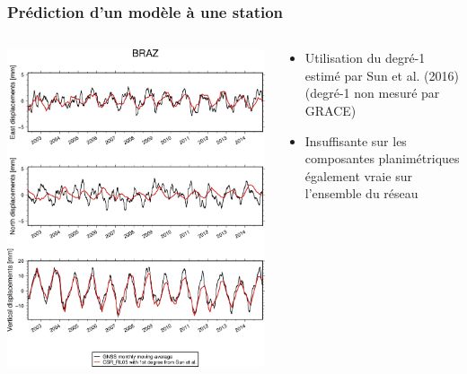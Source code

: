 \documentclass[9pt]{beamer}
\begin{document}
\begin{frame}
\frametitle{Prédiction d'un modèle à une station}
\begin{columns}
        \begin{column}{0.6\textwidth}

            \includegraphics[width=\textwidth]{figures/BRAZ_GRACE_CSR5_w1dSun_vs_IG2.png}
        \end{column}
        \begin{column}{0.45\textwidth}
            \begin{itemize}
                \item Utilisation du degré-1 estimé par Sun et al. (2016) \\(degré-1 non mesuré par GRACE)
                \item Insuffisante sur les composantes planimétriques également vraie sur l'ensemble du réseau
            \end{itemize}   
        \end{column}
\end{columns}


\end{frame}
\end{document}
